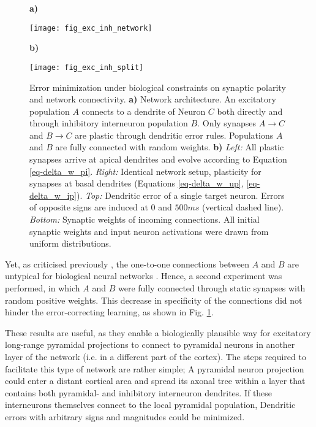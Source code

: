 \begin{figure}[h]
    \centering
    \begin{minipage}{0.2\textwidth}
        \textbf{a)}\par\medskip
        \centering
        \texttt{[image: fig\_exc\_inh\_network]}
    \end{minipage}\hfill
    \begin{minipage}{0.7\textwidth}
        \textbf{b)}\par\medskip
        \centering
        \texttt{[image: fig\_exc\_inh\_split]}
    \end{minipage}
    \caption[Error minimization under biological constraints on synaptic polarity and network connectivity]{Error
        minimization under biological constraints on synaptic polarity and network connectivity. \textbf{a)} Network
        architecture. An excitatory population $A$ connects to a dendrite of Neuron $C$ both directly and through
        inhibitory interneuron population $B$. Only synapses $A\rightarrow C$ and $B \rightarrow C$ are plastic through
        dendritic error rules. Populations $A$ and $B$ are fully connected with random weights. \textbf{b)}
        \textit{Left:} All plastic synapses arrive at apical dendrites and evolve according to Equation
        \ref{eq-delta_w_pi}. \textit{Right:} Identical network setup, plasticity for synapses at basal dendrites
        (Equations \ref{eq-delta_w_up}, \ref{eq-delta_w_ip}). \textit{Top:} Dendritic error of a single target neuron.
        Errors of opposite signs are induced at $0$ and $500ms$ (vertical dashed line). \textit{Bottom:} Synaptic
        weights of incoming connections. All initial synaptic weights and input neuron activations were drawn from
        uniform distributions.}
    \label{fig-exc-inh-split}
\end{figure}

Yet, as criticised previously \citep{whittington2019theories}, the one-to-one connections between $A$ and $B$ are
untypical for biological neural networks \citeme. Hence, a second experiment was performed, in which $A$ and $B$ were
fully connected through static synapses with random positive weights. This decrease in specificity of the connections
did not hinder the error-correcting learning, as shown in Fig. \ref{fig-exc-inh-split}.

These results are useful, as they enable a biologically plausible way for excitatory long-range pyramidal projections to
connect to pyramidal neurons in another layer of the network (i.e. in a different part of the cortex). The steps
required to facilitate this type of network are rather simple; A pyramidal neuron projection could enter a distant
cortical area and spread its axonal tree \phrasing within a layer that contains both pyramidal- and inhibitory
interneuron dendrites. If these interneurons themselves connect to the local pyramidal population, Dendritic errors with
arbitrary signs and magnitudes could be minimized.

